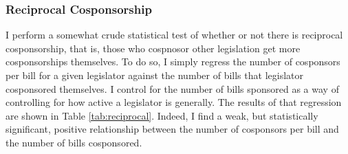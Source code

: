\documentclass{article}
\begin{document}
  \subsubsection{Reciprocal Cosponsorship}
  \label{result:reciprocal_cosponsorship}
  I perform a somewhat crude statistical test of whether or not there is reciprocal cosponsorship, that is, those who cospnosor other legislation get more cosponsorships themselves. To do so, I simply regress the number of cosponsors per bill for a given legislator against the number of bills that legislator cosponsored themselves. I control for the number of bills sponsored as a way of controlling for how active a legislator is generally. The results of that regression are shown in Table \ref{tab:reciprocal}. Indeed, I find a weak, but statistically significant, positive relationship between the number of cosponsors per bill and the number of bills cosponsored.
\end{document}
